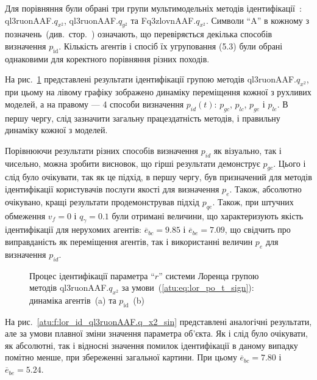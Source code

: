 Для порівняння були обрані три групи мультимодельніх методів
ідентифікації~\cite{atu_ISDMCI2015,atu_asau26}:
ql3ruonAAF.$q_{x^2} $,
ql3ruonAAF.$q_{y^2} $ та
Fq3zlovnAAF.$q_{x^2} $.
Символи ``A'' в кожному з позначень~(див.~стор.~\pageref{atu:id_classification}) означають, що
перевіряється декілька способів визначення
$p_\mathrm{id} $. Кількість агентів і спосіб їх угруповання (5.3) були
обрані однаковими для коректного порівняння різних походів.


На рис.~\ref{atu:f:lor_id_ql3ruonAAF.q_x2_sign} представлені результати
ідентифікації групою методів ql3ruonAAF.$q_{x^2}$, при цьому на лівому графіку зображено динаміку
переміщення кожної з рухливих моделей, а на правому --- 4 способи
визначення
$p_{id}(t)$:
$p_{gc}$,
$p_{lc}$,
$p_{ge}$ і
$p_{le}$. В першу чергу, слід зазначити загальну працездатність
методів, і правильну динаміку кожної з моделей.


Порівнюючи результати різних способів визначення
$p_{id}$ як візуально, так і чисельно, можна зробити висновок, що
гірші результати демонструє
$p_{gc}$. Цього і слід було очікувати, так як це підхід, в першу
чергу, був призначений для методів ідентифікації користувачів
послуги якості для визначення
$p_e$. Також, абсолютно очікувано, кращі результати
продемонстрував підхід
$p_{qe}$. Також, при штучних обмеження
$v_f = 0$ і
$q_\gamma = 0.1 $ були отримані величини, що характеризують якість
ідентифікації для нерухомих агентів:
$\overline{e}_{bc} = 9.85 $ і
$\overline{e}_{be} = 7.09 $, що свідчить про виправданість як переміщення
агентів, так і використанні величин
$p_e$ для визначення
$p_{id}$.



\begin{figure}[htb!]
  \caption{Процес ідентифікації параметра ``$r$'' системи Лоренца групою методів ql3ruonAAF.$q_{x^2} $ за умови~(\ref{atu:eq:lor_po_t_sign}): динаміка агентів~(a) та $p_\mathrm{id}$~(b)}
  \label{atu:f:lor_id_ql3ruonAAF.q_x2_sign}
\end{figure}


На рис.~\ref{atu:f:lor_id_ql3ruonAAF.q_x2_sin} представлені аналогічні результати,
але за умови плавної зміни значення параметра об'єкта. Як і слід
було очікувати, як абсолютні, так і відносні значення помилок
ідентифікації в даному випадку помітно менше, при збереженні
загальної картини. При цьому
$\overline{e}_{bc}=7.80$
і
$\overline{e}_{be}=5.24$.


